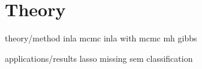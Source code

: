 \chapter{Theory}
\label{chap:Theory}
theory/method
inla
mcmc
inla with mcmc 
    mh 
    gibbs
    
applications/results
    lasso
    missing
    sem
    classification
    

    
